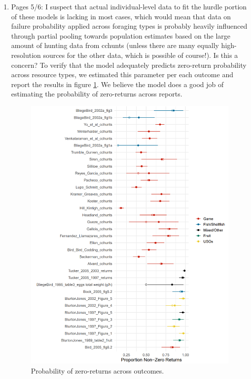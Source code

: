 \documentclass{article}
\newcommand{\rev}[1]{{\color{ForestGreen}#1}}
\begin{document}
\begin{enumerate}
    \item Pages 5/6: I suspect that actual individual-level data to fit the hurdle portion of these models is  lacking in most cases, which would mean that data on failure probability applied across foraging  types is probably heavily influenced through partial pooling towards population estimates based  on the large amount of hunting data from cchunts (unless there are many equally high-resolution  sources for the other data, which is possible of course!). Is this a concern?  
    \rev{To verify that the model adequately predicts zero-return probability across resource types, we estimated this parameter per each outcome and report the results in figure \ref{fig:reply_2}. We believe the model does a good job of estimating the probability of zero-returns across reports. }
    \begin{figure}
        \centering
        \includegraphics[width=16cm]{text/images/reply_2.png}
        \caption{Probability of zero-returns across outcomes.}
        \label{fig:reply_2}
    \end{figure}
    

\end{enumerate}
\end{document}

